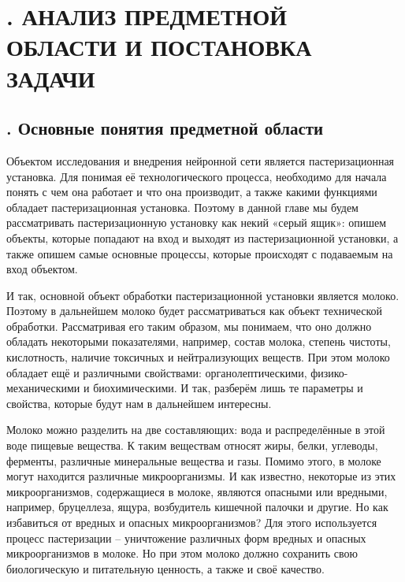\setcounter{chaptercntr}{1}

\sectionbreak \section*{
  \gostTitleFont
  \redline
  \thechaptercntr .
  АНАЛИЗ ПРЕДМЕТНОЙ ОБЛАСТИ И ПОСТАНОВКА ЗАДАЧИ
}

\titlespace

\subsection*{
  \gostTitleFont
  \redline
  \thechaptercntr .\thesubchaptercntr \spc
  Основные понятия предметной области
} \addtocounter{subchaptercntr}{1}

\subtitlespace

{\gostFont

  \par \redline Объектом исследования и внедрения нейронной сети является пастеризационная установка. Для понимая её технологического процесса, необходимо для начала понять с чем она работает и что она производит, а также какими функциями обладает пастеризационная установка. Поэтому в данной главе мы будем рассматривать пастеризационную установку как некий «серый ящик»: опишем объекты, которые попадают на вход и выходят из пастеризационной установки, а также опишем самые основные процессы, которые происходят с подаваемым на вход объектом.

  \par \redline И так, основной объект обработки пастеризационной установки является молоко. Поэтому в дальнейшем молоко будет рассматриваться как объект технической обработки. Рассматривая его таким образом, мы понимаем, что оно должно обладать некоторыми показателями, например, состав молока, степень чистоты, кислотность, наличие токсичных и нейтрализующих веществ. При этом молоко обладает ещё и различными свойствами: органолептическими, физико-механическими и биохимическими. И так, разберём лишь те параметры и свойства, которые будут нам в дальнейшем интересны.

  \par \redline Молоко можно разделить на две составляющих: вода и распределённые в этой воде пищевые вещества. К таким веществам относят жиры, белки, углеводы, ферменты, различные минеральные вещества и газы. Помимо этого, в молоке могут находится различные микроорганизмы. И как известно, некоторые из этих микроорганизмов, содержащиеся в молоке, являются опасными или вредными, например, бруцеллеза, ящура, возбудитель кишечной палочки и другие. Но как избавиться от вредных и опасных микроорганизмов?  Для этого используется процесс пастеризации {--} уничтожение различных форм вредных и опасных микроорганизмов в молоке. Но при этом молоко должно сохранить свою биологическую и питательную ценность, а также и своё качество.

}
